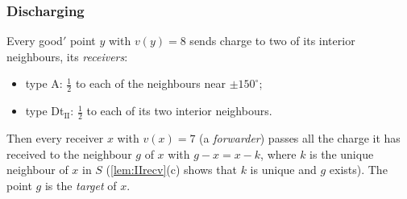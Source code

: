 \documentclass[11pt]{amsart}
\theoremstyle{definition}
\theoremstyle{remark}
\begin{document}
\subsubsection*{Discharging}
Every good$'$ point $y$ with $v(y)=8$ sends charge to two of its interior neighbours, its \emph{receivers}:
\begin{itemize}[leftmargin=2em]
\item type A: $\frac12$ to each of the neighbours near $\pm150^\circ$;
\item type Dt$_{\mathrm{II}}$: $\frac12$ to each of its two interior neighbours.
\end{itemize}
Then every receiver $x$ with $v(x)=7$ (a \emph{forwarder}) passes all the charge it has received to the neighbour $g$ of $x$ with $g-x=x-k$, where $k$ is the unique neighbour of $x$ in $S$ (\cref{lem:IIrecv}(c) shows that $k$ is unique and $g$ exists). The point $g$ is the \emph{target} of $x$.
\end{document}
